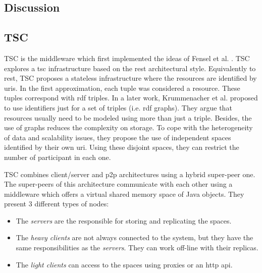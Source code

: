 \subsection{Discussion}







\subsection{TSC}
TSC \citep{fensel_tsc_2007} is the middleware which first implemented the ideas of Fensel et al. \citep{fensel_triple-space_2004}.
TSC explores a \acl{tsc} infrastructure based on the \ac{rest} architectural style.
Equivalently to \ac{rest}, TSC proposes a stateless infrastructure where the resources are identified by \acp{uri}.
In the first approximation, each tuple was considered a resource.
These tuples correspond with \ac{rdf} triples.
In a later work,  Krummenacher et al. \citep{krummenacher2006specification} proposed to use identifiers just for a set of triples (i.e. \ac{rdf} graphs).
They argue that resources usually need to be modeled using more than just a triple.
Besides, the use of graphs reduces the complexity on storage.
To cope with the heterogeneity of data and scalability issues, they propose the use of independent spaces identified by their own \ac{uri}.
Using these disjoint spaces, they can restrict the number of participant in each one.


TSC combines client/server and \ac{p2p} architectures using a hybrid super-peer one.
The super-peers of this architecture communicate with each other using a middleware which offers a virtual shared memory space of Java objects.
They present 3 different types of nodes:
\begin{itemize}
  \item The \emph{servers} are the responsible for storing and replicating the spaces.
  \item The \emph{heavy clients} are not always connected to the system, but they have the same responsibilities as the \emph{servers}.
	They can work off-line with their replicas.
  \item The \emph{light clients} can access to the spaces using proxies or an \ac{http} \acs{api}.
\end{itemize}


